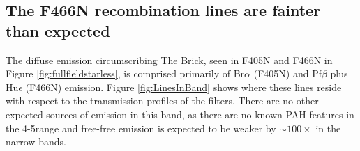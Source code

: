 \documentclass[times,astrosymb,twocolumn]{aastex631}
\def\rr#1{#1}
\begin{document}

\subsection{The F466N recombination lines \rr{are fainter than expected}}
\label{sec:recombination}
The diffuse emission circumscribing The Brick, seen in F405N and F466N in Figure \ref{fig:fullfieldstarless}, is comprised primarily of Br$\alpha$ (F405N) and Pf$\beta$ plus Hu$\epsilon$ (F466N) emission.
Figure \ref{fig:LinesInBand} shows where these lines reside with respect to the transmission profiles of the filters.
There are no other expected sources of emission in this band, as there are no known PAH features in the 4-5\um range and free-free emission is expected to be weaker by $\sim100\times$ in the narrow bands.
\end{document}
